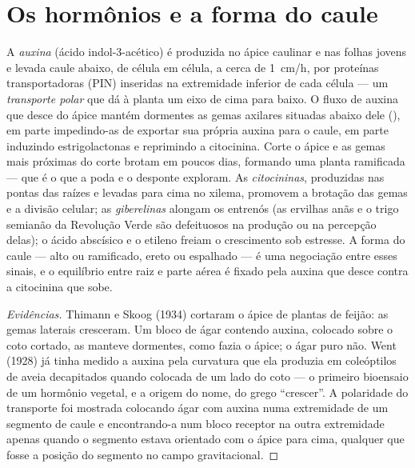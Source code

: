 \section{Os hormônios e a forma do caule}

\begin{proposition}\label{prop:b2:plant-meristems:apical}
A \emph{auxina} (ácido indol-3-acético) é produzida no ápice caulinar e
nas folhas jovens e levada caule abaixo, de célula em célula, a cerca
de \qty{1}{cm/h}, por proteínas transportadoras (PIN) inseridas na
extremidade inferior de cada célula --- um \emph{transporte polar} que
dá à planta um eixo de cima para baixo. O fluxo de auxina que desce do
ápice mantém dormentes as gemas axilares situadas abaixo dele
(\emph{}), em parte impedindo-as de exportar sua
própria auxina para o caule, em parte induzindo estrigolactonas e
reprimindo a citocinina. Corte o ápice e as gemas mais próximas do corte
brotam em poucos dias, formando uma planta ramificada --- que é o que a
poda e o desponte exploram. As \emph{citocininas}, produzidas nas
pontas das raízes e levadas para cima no xilema, promovem a brotação das
gemas e a divisão celular; as \emph{giberelinas} alongam os entrenós
(as ervilhas anãs e o trigo semianão da Revolução Verde são defeituosos
na produção ou na percepção delas); o ácido abscísico e o etileno
freiam o crescimento sob estresse. A forma do caule --- alto ou
ramificado, ereto ou espalhado --- é uma negociação entre esses sinais,
e o equilíbrio entre raiz e parte aérea é fixado pela auxina que desce
contra a citocinina que sobe.
\end{proposition}
\begin{proof}[Evidências]
Thimann e Skoog (1934) cortaram o ápice de plantas de feijão: as gemas
laterais cresceram. Um bloco de ágar contendo auxina, colocado sobre o
coto cortado, as manteve dormentes, como fazia o ápice; o ágar puro
não. Went (1928) já tinha medido a auxina pela curvatura que ela
produzia em coleóptilos de aveia decapitados quando colocada de um lado
do coto --- o primeiro bioensaio de um hormônio vegetal, e a origem do
nome, do grego ``crescer''. A polaridade do transporte foi mostrada
colocando ágar com auxina numa extremidade de um segmento de caule e
encontrando-a num bloco receptor na outra extremidade apenas quando o
segmento estava orientado com o ápice para cima, qualquer que fosse a
posição do segmento no campo gravitacional.
\end{proof}

